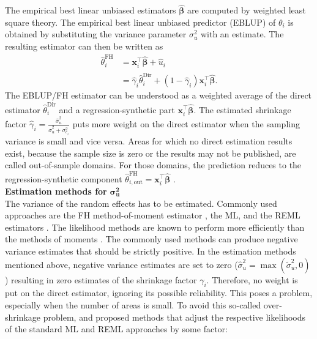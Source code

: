 %
The empirical best linear unbiased estimators $\boldsymbol{\hat{\beta}}$ are computed by weighted
least square theory. The empirical best linear unbiased predictor (EBLUP)
of $\theta_i$ is obtained by substituting the variance parameter $\sigma_u^2$
with an estimate. The resulting estimator can then be written as
%
\begin{align}
\nonumber \hat{\theta}_i^{\text{FH}}&=
\boldsymbol{x}_i^{\top}\boldsymbol{\hat{\beta}} + \hat{u}_i \\
&=\hat{\gamma}_i\hat{\theta}_i^{\text{Dir}}+\left(1-\hat{\gamma}_i\right)
\boldsymbol{x}_i^{\top}\boldsymbol{\hat{\beta}}.
\label{eq:EBLUP}
\end{align}
%
The EBLUP/FH estimator can be understood as a weighted average of the direct
estimator $\hat{\theta}_i^{\text{Dir}}$ and a regression-synthetic part
$\boldsymbol{x}_i^{\top}\boldsymbol{\hat{\beta}}$.
The estimated shrinkage factor
$\hat{\gamma}_i=\frac{\hat{\sigma}_u^2}{\hat{\sigma}_u^2+\sigma_{e_{i}}^2}$
puts more weight on the direct estimator when the sampling variance is small and
vice versa. Areas for which no direct estimation results exist, because the sample
size is zero or the results may not be published, are called out-of-sample domains.
For those domains, the prediction reduces to the regression-synthetic component
$\hat{\theta}_{i,\text{out}}^{\text{FH}} =
\boldsymbol{x}_i^{\top}\boldsymbol{\hat{\beta}}$ \citep{Rao2015}. \\ \newline
\textbf{Estimation methods for} $\boldsymbol{\sigma_u^2}$ \\
The variance of the random effects has to be estimated. Commonly used approaches
are the FH method-of-moment estimator \citep{Fay1979}, the ML,
and the REML estimators \citep{Rao2015}. The likelihood methods are known to
perform more efficiently than the methods of moments \citep{Rao2015}. The
commonly used methods can produce negative variance estimates that should be strictly positive. In the estimation methods mentioned above, negative
variance estimates are set to zero ($\hat{\sigma}_{u}^{2} =
\max\left(\tilde{\sigma}_{u}^{2}, 0\right)$) resulting in zero estimates of the shrinkage
factor $\gamma_i$. Therefore, no weight is put on the direct estimator, ignoring its
possible reliability. This poses a problem, especially when the number of areas
is small. To avoid this so-called over-shrinkage problem, \citet{Li2010} and
\citet{Yoshimori2014} proposed methods that adjust the respective likelihoods of
the standard ML and REML approaches by some factor:
